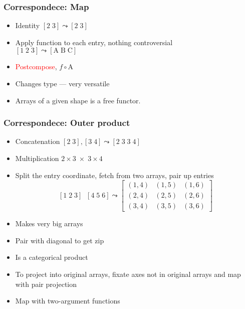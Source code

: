 \documentclass[xetex,mathserif,serif]{beamer}
\newcommand\mrm[1]{\mathrm{#1}}
\newcommand\brm[1]{\bm{\mrm{#1}}}
\newcommand\oprodby[1]{\mathop{\operatorname*{\,\brm{by}}_{#1}}}
\newcommand\NB[1]{\textcolor{red}{#1}}
\begin{document}
\begin{frame}
  \frametitle{Correspondece: Map}
  \begin{itemize}%
    \item Identity \([2\;3] \leadsto [2\;3]\)
    \item Apply function to each entry, nothing controversial\\
      \([1\;2\;3] \leadsto [\mrm A\;\mrm B\;\mrm C]\)
    \item \NB{Postcompose}, \(f \circ \brm A\)
    \item Changes type --- very versatile
    \item Arrays of a given shape is a free functor.
  \end{itemize}
\end{frame}

\begin{frame}
  \frametitle{Correspondece: Outer product}
  \begin{itemize}%
    \item Concatenation \([2\;3], [3\;4] \leadsto [2\;3\;3\;4]\)
    \item Multiplication \(2\times3 \;\times\; 3\times4\)
    \item Split the entry coordinate, fetch from two arrays, pair up
      entries
      \[[1\;2\;3] \oprodby{} [4\;5\;6] \leadsto
      \begin{bmatrix}
        (1,4) & (1,5) & (1,6) \\
        (2,4) & (2,5) & (2,6) \\
        (3,4) & (3,5) & (3,6)
      \end{bmatrix}\]
    \item Makes very big arrays
    \item Pair with diagonal to get zip
    \item Is a categorical product
    \item To project into original arrays, fixate axes not in original
      arrays and map with pair projection
    \item Map with two-argument functions
  \end{itemize}
\end{frame}
\end{document}
